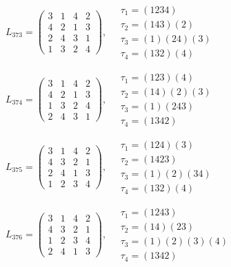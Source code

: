 $L_{373} = \begin{pmatrix} 3 & 1 & 4 & 2 \\ 4 & 2 & 1 & 3 \\ 2 & 4 & 3 & 1 \\ 1 & 3 & 2 & 4 \end{pmatrix}, \quad \begin{matrix} \tau_{1} = (1 2 3 4) \\ \tau_{2} = (1 4 3)(2) \\ \tau_{3} = (1)(2 4)(3) \\ \tau_{4} = (1 3 2)(4) \end{matrix}$

$L_{374} = \begin{pmatrix} 3 & 1 & 4 & 2 \\ 4 & 2 & 1 & 3 \\ 1 & 3 & 2 & 4 \\ 2 & 4 & 3 & 1 \end{pmatrix}, \quad \begin{matrix} \tau_{1} = (1 2 3)(4) \\ \tau_{2} = (1 4)(2)(3) \\ \tau_{3} = (1)(2 4 3) \\ \tau_{4} = (1 3 4 2) \end{matrix}$

$L_{375} = \begin{pmatrix} 3 & 1 & 4 & 2 \\ 4 & 3 & 2 & 1 \\ 2 & 4 & 1 & 3 \\ 1 & 2 & 3 & 4 \end{pmatrix}, \quad \begin{matrix} \tau_{1} = (1 2 4)(3) \\ \tau_{2} = (1 4 2 3) \\ \tau_{3} = (1)(2)(3 4) \\ \tau_{4} = (1 3 2)(4) \end{matrix}$

$L_{376} = \begin{pmatrix} 3 & 1 & 4 & 2 \\ 4 & 3 & 2 & 1 \\ 1 & 2 & 3 & 4 \\ 2 & 4 & 1 & 3 \end{pmatrix}, \quad \begin{matrix} \tau_{1} = (1 2 4 3) \\ \tau_{2} = (1 4)(2 3) \\ \tau_{3} = (1)(2)(3)(4) \\ \tau_{4} = (1 3 4 2) \end{matrix}$

